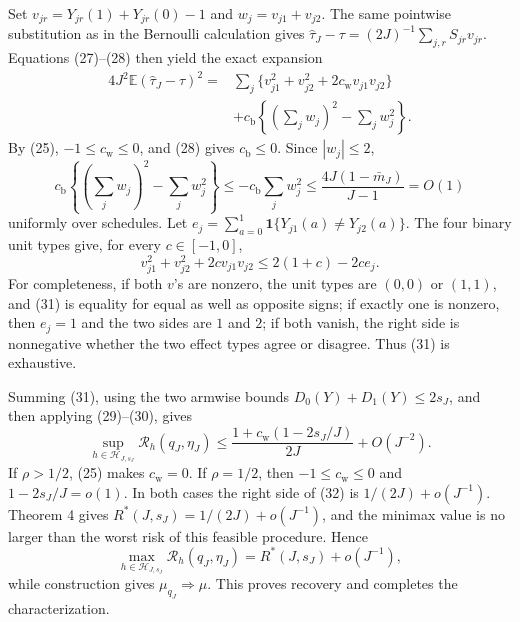 Set \(v_{jr}=Y_{jr}(1)+Y_{jr}(0)-1\) and \(w_j=v_{j1}+v_{j2}\).  The same pointwise substitution as in the Bernoulli calculation gives
\(
 \widehat\tau_J-\tau=(2J)^{-1}\sum_{j,r}S_{jr}v_{jr}
\).  Equations (27)--(28) then yield the exact expansion
\[
\begin{split}
 4J^2\mathbb E(\widehat\tau_J-\tau)^2
 ={}&\sum_j\{v_{j1}^2+v_{j2}^2
       +2c_{\mathrm w}v_{j1}v_{j2}\}\\
 &+c_{\mathrm b}\left\{
       \left(\sum_jw_j\right)^2-\sum_jw_j^2
       \right\}.
\end{split}
 \tag{29}
\]
By (25), \(-1\le c_{\mathrm w}\le0\), and (28) gives \(c_{\mathrm b}\le0\).  Since \(|w_j|\le2\),
\[
 c_{\mathrm b}\left\{
 (\sum_jw_j)^2-\sum_jw_j^2\right\}
 \le -c_{\mathrm b}\sum_jw_j^2
 \le\frac{4J(1-\bar m_J)}{J-1}=O(1)
 \tag{30}
\]
uniformly over schedules.  Let
\(
 e_j=\sum_{a=0}^1\mathbf 1\{Y_{j1}(a)\ne Y_{j2}(a)\}
\).  The four binary unit types give, for every \(c\in[-1,0]\),
\[
 v_{j1}^2+v_{j2}^2+2cv_{j1}v_{j2}
 \le2(1+c)-2ce_j.
 \tag{31}
\]
For completeness, if both \(v\)'s are nonzero, the unit types are \((0,0)\) or \((1,1)\), and (31) is equality for equal as well as opposite signs; if exactly one is nonzero, then \(e_j=1\) and the two sides are \(1\) and \(2\); if both vanish, the right side is nonnegative whether the two effect types agree or disagree.  Thus (31) is exhaustive.

Summing (31), using the two armwise bounds \(D_0(Y)+D_1(Y)\le2s_J\), and then applying (29)--(30), gives
\[
 \sup_{h\in\mathcal H_{J,s_J}}
 \mathcal R_h(q_J,\eta_J)
 \le
 \frac{1+c_{\mathrm w}(1-2s_J/J)}{2J}
 +O(J^{-2}).
 \tag{32}
\]
If \(\rho>1/2\), (25) makes \(c_{\mathrm w}=0\).  If \(\rho=1/2\), then \(-1\le c_{\mathrm w}\le0\) and \(1-2s_J/J=o(1)\).  In both cases the right side of (32) is \(1/(2J)+o(J^{-1})\).  Theorem 4 gives \(R^*(J,s_J)=1/(2J)+o(J^{-1})\), and the minimax value is no larger than the worst risk of this feasible procedure.  Hence
\[
 \max_{h\in\mathcal H_{J,s_J}}\mathcal R_h(q_J,\eta_J)
 =R^*(J,s_J)+o(J^{-1}),
\]
while construction gives \(\mu_{q_J}\Rightarrow\mu\).  This proves recovery and completes the characterization.
